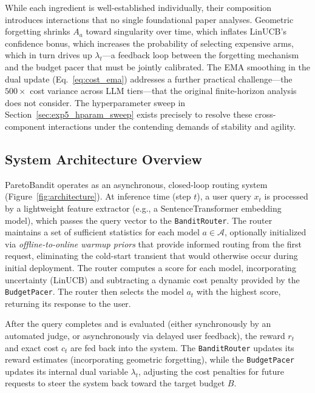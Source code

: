 While each ingredient is well-established individually, their composition introduces interactions that no single foundational paper analyses.
Geometric forgetting shrinks $A_a$ toward singularity over time, which inflates LinUCB's confidence bonus, which increases the probability of selecting expensive arms, which in turn drives up $\lambda_t$---a feedback loop between the forgetting mechanism and the budget pacer that must be jointly calibrated.
The EMA smoothing in the dual update (Eq.~\ref{eq:cost_ema}) addresses a further practical challenge---the $500{\times}$ cost variance across LLM tiers---that the original finite-horizon analysis does not consider.
The hyperparameter sweep in Section~\ref{sec:exp5_hparam_sweep} exists precisely to resolve these cross-component interactions under the contending demands of stability and agility.

\subsection{System Architecture Overview}

ParetoBandit operates as an asynchronous, closed-loop routing system (Figure~\ref{fig:architecture}). At inference time (step $t$), a user query $x_t$ is processed by a lightweight feature extractor (e.g., a SentenceTransformer embedding model), which passes the query vector to the \texttt{BanditRouter}. The router maintains a set of sufficient statistics for each model $a \in \mathcal{A}$, optionally initialized via \emph{offline-to-online warmup priors} that provide informed routing from the first request, eliminating the cold-start transient that would otherwise occur during initial deployment. The router computes a score for each model, incorporating uncertainty (LinUCB) and subtracting a dynamic cost penalty provided by the \texttt{BudgetPacer}. The router then selects the model $a_t$ with the highest score, returning its response to the user.

After the query completes and is evaluated (either synchronously by an automated judge, or asynchronously via delayed user feedback), the reward $r_t$ and exact cost $c_t$ are fed back into the system. The \texttt{BanditRouter} updates its reward estimates (incorporating geometric forgetting), while the \texttt{BudgetPacer} updates its internal dual variable $\lambda_t$, adjusting the cost penalties for future requests to steer the system back toward the target budget $B$.



